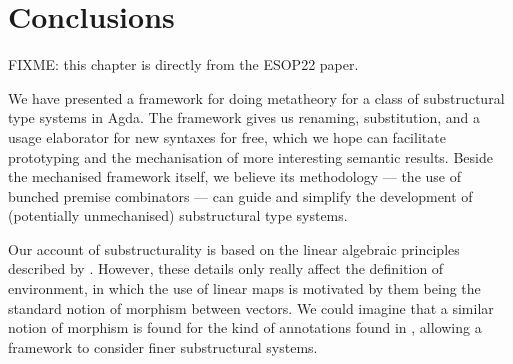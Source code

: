 \chapter{Conclusions}\label{sec:conc}

FIXME: this chapter is directly from the ESOP22 paper.

We have presented a framework for doing metatheory for a class of substructural
type systems in Agda.
The framework gives us renaming, substitution, and a usage elaborator for new
syntaxes for free, which we hope can facilitate prototyping and the
mechanisation of more interesting semantic results.
Beside the mechanised framework itself, we believe its methodology --- the use
of bunched premise combinators --- can guide and simplify the development of
(potentially unmechanised) substructural type systems.

Our account of substructurality is based on the linear algebraic
principles described by \citet{WA20}.
However, these details only really affect the definition of environment,
in which the use of linear maps is motivated by them being the standard notion
of morphism between vectors.
We could imagine that a similar notion of morphism is found for the kind of
annotations found in \citet{LicataSR17}, allowing a framework to consider
finer substructural systems.
